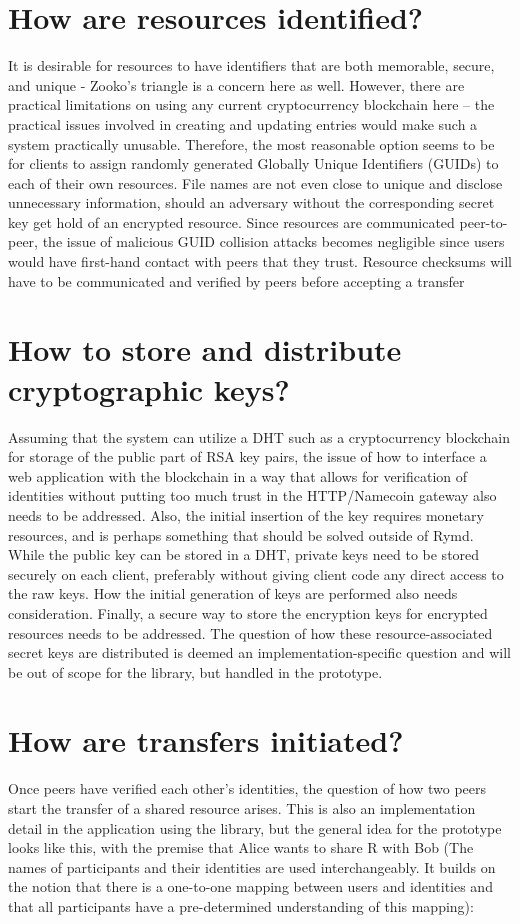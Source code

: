 \section{How are resources identified?}
It is desirable for resources to have identifiers that are both memorable, secure, and unique - Zooko’s triangle is a concern here as well. However, there are practical limitations on using any current cryptocurrency blockchain here – the practical issues involved in creating and updating entries would make such a system practically unusable. Therefore, the most reasonable option seems to be for clients to assign randomly generated Globally Unique Identifiers (GUIDs) to each of their own resources. File names are not even close to unique and disclose unnecessary information, should an adversary without the corresponding secret key get hold of an encrypted resource. Since resources are communicated peer-to-peer, the issue of malicious GUID collision attacks becomes negligible since users would have first-hand contact with peers that they trust. Resource checksums will have to be communicated and verified by peers before accepting a transfer

\section{How to store and distribute cryptographic keys?}
Assuming that the system can utilize a DHT such as a cryptocurrency blockchain for storage of the public part of RSA key pairs, the issue of how to interface a web application with the blockchain in a way that allows for verification of identities without putting too much trust in the HTTP/Namecoin gateway also needs to be addressed. Also, the initial insertion of the key requires monetary resources, and is perhaps something that should be solved outside of Rymd.
While the public key can be stored in a DHT, private keys need to be stored securely on each client, preferably without giving client code any direct access to the raw keys. How the initial generation of keys are performed also needs consideration. Finally, a secure way to store the encryption keys for encrypted resources needs to be addressed. The question of how these resource-associated secret keys are distributed is deemed an implementation-specific question and will be out of scope for the library, but handled in the prototype.

\section{How are transfers initiated?}
Once peers have verified each other’s identities, the question of how two peers start the transfer of a shared resource arises. This is also an implementation detail in the application using the library, but the general idea for the prototype looks like this, with the premise that Alice wants to share R with Bob (The names of participants and their identities are used interchangeably. It builds on the notion that there is a one-to-one mapping between users and identities and that all participants have a pre-determined understanding of this mapping):

